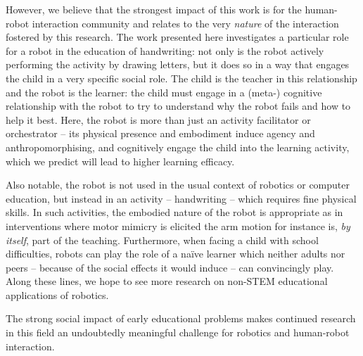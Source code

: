 \documentclass{sig-alternate}
\begin{document}
However, we believe that the strongest impact of this work is for the human-robot
interaction community and relates to the very \emph{nature} of the interaction
fostered by this research. The work presented here investigates a particular
role for a robot in the education of handwriting: not only is the robot actively
performing the activity by drawing letters, but it does so in a way that engages
the child in a very specific social role. The child is the teacher in this relationship and the robot is
the learner: the child must engage in a (meta-) cognitive relationship with the robot
to try to understand why the robot fails and how to help it best.  Here, the
robot is more than just an activity facilitator or orchestrator -- its physical presence
and embodiment induce agency and anthropomorphising, and cognitively engage the
child into the learning activity, which we predict will lead to higher learning
efficacy.

Also notable, the robot is not used in the usual context of robotics or computer
education, but instead in an activity -- handwriting -- which requires fine
physical skills. In such activities, the embodied nature of the robot is appropriate as in interventions where motor mimicry is elicited \cite{Berninger1997} the arm motion for instance is, \emph{by
itself}, part of the teaching. Furthermore, when facing a child with school 
difficulties, robots can play the role of a na\"ive learner which neither adults 
nor peers -- because of the social effects it would induce -- can convincingly 
play. Along these lines, we hope to see more research
on non-STEM educational applications of robotics.


The strong social impact of early educational problems makes continued research in this field
an undoubtedly meaningful challenge for robotics and human-robot interaction.

%





\end{document}
